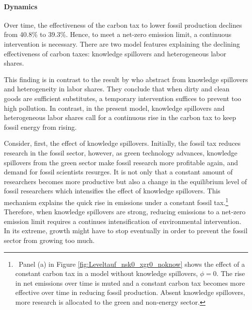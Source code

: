 \paragraph{Dynamics}

Over time, the effectiveness of the carbon tax to lower fossil production declines from 40.8\% to 39.3\%. Hence, to meet a net-zero emission limit, a continuous intervention is necessary. There are two model features explaining the declining effectiveness of carbon taxes: knowledge spillovers and heterogeneous labor shares.  

This finding is in contrast to the result by \cite{Acemoglu2012TheChange} who abstract from knowledge spillovers and heterogeneity in labor shares. They conclude that when dirty and clean goods are sufficient substitutes, a temporary intervention suffices to prevent too high pollution. In contrast, in the present model, knowledge spillovers and heterogeneous labor shares 
call for a continuous rise in the carbon tax to keep fossil energy from rising. 

Consider, first, the effect of knowledge spillovers.
Initially, the fossil tax reduces research in the fossil sector, however, as green technology advances, knowledge spillovers from the green sector make fossil research more profitable again, and demand for fossil scientists resurges.
It is not only that a constant amount of researchers becomes more productive but also a change in the equilibrium level of fossil researchers which intensifies the effect of knowledge spillovers. This mechanism explains the quick rise in emissions under a constant fossil tax.\footnote{\ Panel (a) in Figure \ref{fig:Leveltauf_nsk0_xgr0_noknow} shows the effect of a constant carbon tax in a model without knowledge spillovers, $\phi=0$. The rise in net emissions over time is muted and a constant carbon tax becomes more effective over time in reducing fossil production.  Absent knowledge spillovers, more research is allocated to the green and non-energy sector.} 
Therefore, when knowledge spillovers are strong, reducing emissions to a net-zero emission limit requires a continues intensification of environmental intervention. In its extreme, growth might have to stop eventually in order to prevent the fossil sector from growing too much.

